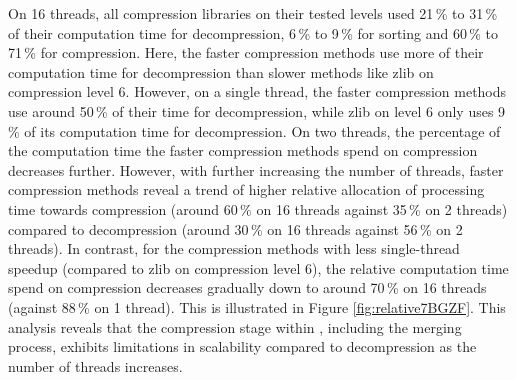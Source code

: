 On 16 threads, all compression libraries on their tested levels used 21\,\% to 31\,\% of their computation time for decompression, 6\,\% to 9\,\% for sorting and 60\,\% to 71\,\% for compression. Here, the faster compression methods use more of their computation time for decompression than slower methods like zlib on compression level 6. However, on a single thread, the faster compression methods use around 50\,\% of their time for decompression, while zlib on level 6 only uses 9\,\% of its computation time for decompression. On two threads, the percentage of the computation time the faster compression methods spend on compression decreases further. However, with further increasing the number of threads, faster compression methods reveal a trend of higher relative allocation of processing time towards compression (around 60\,\% on 16 threads against 35\,\% on 2 threads) compared to decompression (around 30\,\% on 16 threads against 56\,\% on 2 threads). In contrast, for the compression methods with less single-thread speedup (compared to zlib on compression level 6), the relative computation time spend on compression decreases gradually down to around 70\,\% on 16 threads (against 88\,\% on 1 thread). This is illustrated in Figure \ref{fig:relative7BGZF}.
This analysis reveals that the compression stage within \sort, including the merging process, exhibits limitations in scalability compared to decompression as the number of threads increases. 

